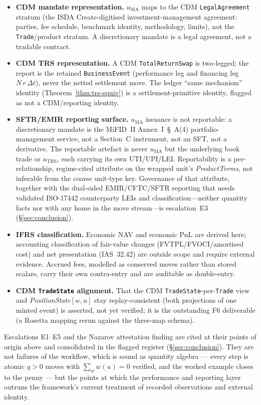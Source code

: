 \begin{itemize}[leftmargin=*]
\item \textbf{CDM mandate representation.} $u_{\mathrm{MA}}$ maps to the CDM
\texttt{LegalAgreement} stratum (the ISDA Create-digitised investment-management agreement:
parties, fee schedule, benchmark identity, methodology, limits), not the \texttt{Trade}/product
stratum. A discretionary mandate is a legal agreement, not a tradable contract.
\item \textbf{CDM TRS representation.} A CDM \texttt{TotalReturnSwap} is two-legged; the report is
the retained \texttt{BusinessEvent} (performance leg and financing leg $N\,r\,\Delta t$), never the
netted settlement move. The ledger ``same mechanism'' identity (Theorem~\ref{thm:trs-equiv}) is a
settlement-primitive identity, flagged as not a CDM/reporting identity.
\item \textbf{SFTR/EMIR reporting surface.} $u_{\mathrm{MA}}$ issuance is not reportable: a
discretionary mandate is the MiFID~II Annex~I~\S~A(4) portfolio-management service, not a Section~C
instrument, not an SFT, not a derivative.
The reportable artefact is never $u_{\mathrm{MA}}$ but the underlying book trade or
$u_{\mathrm{TRS}}$, each carrying its own UTI/UPI/LEI. Reportability is a per-relationship,
regime-cited attribute on the wrapped unit's \textit{ProductTerms}, not inferable from the coarse
unit-type key. Governance of that attribute, together with the dual-sided EMIR/CFTC/SFTR reporting
that needs validated ISO-17442 counterparty LEIs and classification---neither quantity facts nor
with any home in the move stream---is escalation~E3 (\S\ref{sec:conclusion}).
\item \textbf{IFRS classification.} Economic NAV and economic PnL are derived here; accounting
classification of fair-value changes (FVTPL/FVOCI/amortised cost) and net presentation
(IAS~32.42) are outside scope and require external evidence. Accrued fees, modelled as conserved
moves rather than stored scalars, carry their own contra-entry and are auditable as double-entry.
\item \textbf{CDM \texttt{TradeState} alignment.} That the CDM
\texttt{TradeState}-per-\texttt{Trade} view and \textit{PositionState}$[w,u]$ stay replay-consistent
(both projections of one minted event) is asserted, not yet verified; it is the outstanding F6
deliverable (a Rosetta mapping rerun against the three-map schema).
\end{itemize}

Escalations E1--E5 and the Nazarov attestation finding are cited at their points of origin above
and consolidated in the flagged register (\S\ref{sec:conclusion}). They are not failures of the workflow,
which is sound as quantity algebra --- every step is atomic $q>0$ moves with $\sum_w w(u)=0$
verified, and the worked example closes to the penny --- but the points at which the performance and
reporting layer outruns the framework's current treatment of recorded observations and external
identity.
